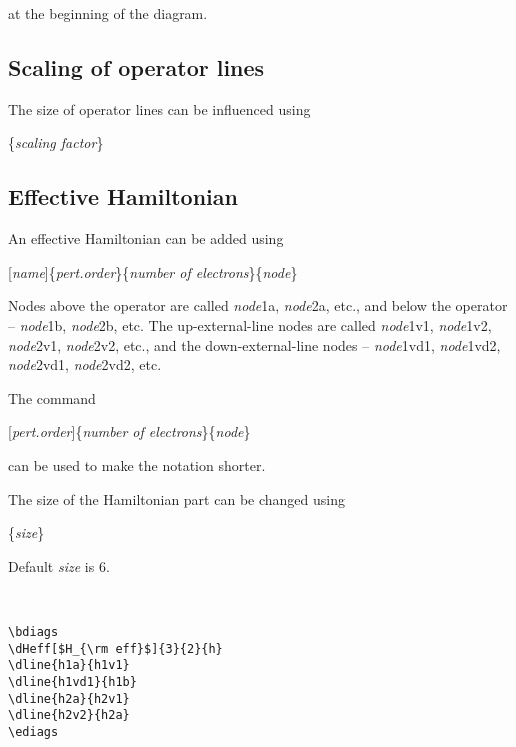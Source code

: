 \documentclass[a4paper]{article}
\newcommand{\myind}{\hspace{10pt}}
\begin{document}
\myind{\bf \textbackslash dfeynman}

at the beginning of the diagram.

\subsection{Scaling of operator lines}

The size of operator lines can be influenced using

\myind{\bf \textbackslash dscaleop}\{{\it scaling factor}\}

\subsection{Effective Hamiltonian}

An effective Hamiltonian can be added using

\myind{\bf \textbackslash dHeff}[{\it name}]\{{\it pert.order}\}\{{\it number of electrons}\}\{{\it node}\}

Nodes above the operator are called {\it node}1a, {\it node}2a, etc., 
and below the operator -- {\it node}1b, {\it node}2b, etc.
The up-external-line nodes are called {\it node}1v1, {\it node}1v2, {\it node}2v1, {\it node}2v2, etc.,
and the down-external-line nodes -- {\it node}1vd1, {\it node}1vd2, {\it node}2vd1, {\it node}2vd2, etc.

The command

\myind{\bf \textbackslash dHeffs}[{\it pert.order}]\{{\it number of electrons}\}\{{\it node}\}

can be used to make the notation shorter.

The size of the Hamiltonian part can be changed using

\myind{\bf \textbackslash dheffsize}\{{\it size}\}

Default {\it size} is 6.
 
~\\
 \begin{minipage}[b]{0.5\linewidth}\centering
  \begin{lstlisting}
\bdiags
\dHeff[$H_{\rm eff}$]{3}{2}{h}
\dline{h1a}{h1v1}
\dline{h1vd1}{h1b}
\dline{h2a}{h2v1}
\dline{h2v2}{h2a}
\ediags
  \end{lstlisting}
 \end{minipage}
 \begin{minipage}[b]{0.5\linewidth}\centering
\bdiags
{}
\ediags
 \end{minipage}
\end{document}
